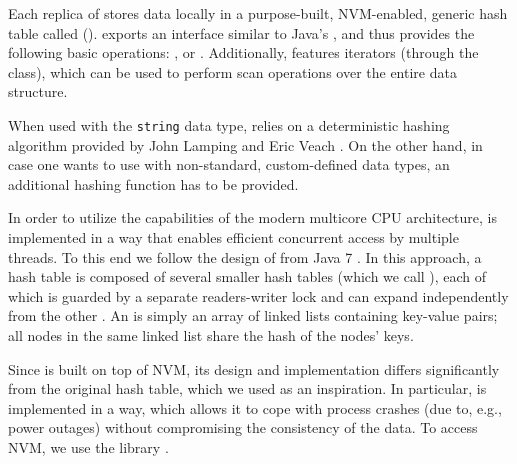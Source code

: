     Each replica of \DHT stores data locally in a purpose-built, NVM-enabled, generic hash table called \emph{\PersistentHashTable} (\PHT). \PHT exports an interface similar to Java's \HashMap \cite{HashMapJava}, and thus provides the following basic operations: \insertMethod, \getMethod or \removeMethod. Additionally, \PHT features iterators (through the \Iterator class), which can be used to perform scan operations over the entire data structure.
    
    When used with the \texttt{string} data type, \PHT relies on a deterministic hashing algorithm provided by John Lamping and Eric Veach \cite{Hashing}. On the other hand, in case one wants to use \PHT with non-standard, custom-defined data types, an additional hashing function has to be provided.
    
    
    
    In order to utilize the capabilities of the modern multicore CPU architecture, \PHT is implemented in a way that enables efficient concurrent access by multiple threads. 
    To this end we follow the design of \ConcurrentHashMap from Java 7 \cite{ConcurrentHashMapJava}. 
    In this approach, a hash table is composed of several smaller hash tables (which we call \internalHashMaps), each of which is guarded by a separate readers-writer lock and can expand independently from the other \internalHashMaps. 
    An \internalHashMap is simply an array of linked lists containing key-value pairs; all nodes in the same linked list share the hash of the nodes' keys.
    
    Since \PHT is built on top of NVM, its design and implementation differs significantly from the original hash table, which we used as an inspiration. 
    In particular, \PHT is implemented in a way, which allows it to cope with process crashes (due to, e.g., power outages) without compromising the consistency of the data. 
    To access NVM, we use the \libpmemobj library \cite{Libpmemobj}.
    
